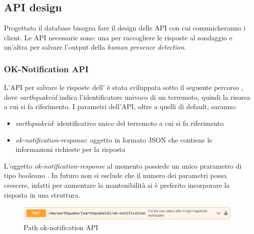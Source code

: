 \documentclass[main.tex]{subfiles}
\begin{document}
\subsection{API design}
Progettato il database bisogna fare il design delle API con cui comunicheranno i client.\newline
Le API necessarie sono: una per raccogliere le risposte al sondaggio  e un'altra per salvare l'output della \emph{human presence detection}.

\subsubsection{OK-Notification API}\label{sec:OK-notification-API}
L'API per salvare le risposte dell'  è stata sviluppata sotto il seguente percorso , dove \emph{earthquakeid} indica l'identificatore univoco di un terremoto, quindi la risorsa a cui si fa riferimento.\newline
I parametri dell'API, oltre a quelli di default, saranno:
\begin{itemize}
    \item \emph{earthquakeid}: identificativo unico del terremoto a cui si fa riferimento
    \item \emph{ok-notification-response}: oggetto in formato JSON che contiene le informazioni richieste per la risposta
\end{itemize}
L'oggetto \emph{ok-notification-response} al momento possiede un unico prarametro di tipo booleano . In futuro non si esclude che il numero dei parametri possa crescere, infatti per aumentare la mantenibilità si è preferito incorporare la risposta  in una struttura.
\begin{figure}[H]
    \centering
    \includegraphics[width=1\linewidth]{img/Post-Earthquake/ok-notification-API-path.PNG}
    \caption{Path ok-notification API}
    \label{fig:OK-notification-path}
\end{figure}
\end{document}
